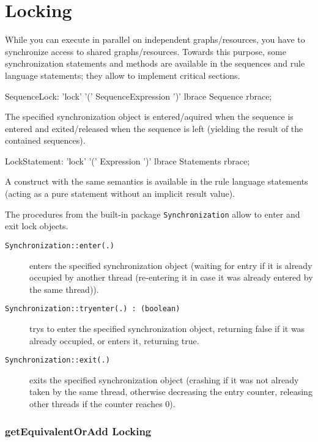 \section{Locking}

While you can execute in parallel on independent graphs/resources, you have to synchronize access to shared graphs/resources.
Towards this purpose, some synchronization statements and methods are available in the sequences and rule language statements; they allow to implement critical sections.

\begin{rail}
  SequenceLock: 'lock' '(' SequenceExpression ')' lbrace Sequence rbrace;
\end{rail}

The specified synchronization object is entered/aquired when the sequence is entered and exited/released when the sequence is left (yielding the result of the contained sequences).

\begin{rail}
  LockStatement: 'lock' '(' Expression ')' lbrace Statements rbrace;
\end{rail}

A construct with the same semantics is available in the rule language statements (acting as a pure statement without an implicit result value).

The procedures from the built-in package \texttt{Synchronization} allow to enter and exit lock objects.

\begin{description}
\item[\texttt{Synchronization::enter(.)}] enters the specified synchronization object (waiting for entry if it is already occupied by another thread (re-entering it in case it was already entered by the same thread)).
\item[\texttt{Synchronization::tryenter(.) : (boolean)}] trys to enter the specified synchronization object, returning false if it was already occupied, or enters it, returning true.
\item[\texttt{Synchronization::exit(.)}] exits the specified synchronization object (crashing if it was not already taken by the same thread, otherwise decreasing the entry counter, releasing other threads if the counter reaches 0).
\end{description}
   
\subsubsection*{getEquivalentOrAdd Locking}

